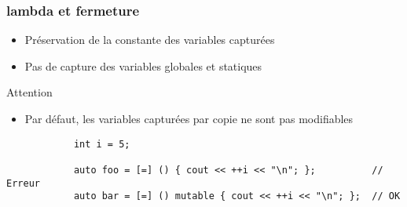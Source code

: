 \documentclass[C++.tex]{subfiles}
\begin{document}
\begin{frame}[fragile]
	\frametitle{lambda et fermeture}
	\begin{itemize}
		\item Préservation de la constante des variables capturées


		\item Pas de capture des variables globales et statiques
	\end{itemize}

	\begin{alertblock}{Attention}
		\begin{itemize}
			\item Par défaut, les variables capturées par copie ne sont pas modifiables
		\end{itemize}

		\begin{verbatim}
			int i = 5;

			auto foo = [=] () { cout << ++i << "\n"; };          // Erreur
			auto bar = [=] () mutable { cout << ++i << "\n"; };  // OK
		\end{verbatim}

	\end{alertblock}
\end{frame}
\end{document}
